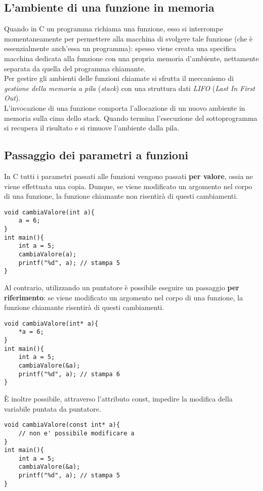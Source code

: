 \subsection{L'ambiente di una funzione in memoria}
Quando in C un programma richiama una funzione, esso si interrompe momentaneamente per permettere alla macchina di svolgere tale funzione (che è essenzialmente anch’essa un programma): spesso viene creata una specifica macchina dedicata alla funzione con una propria memoria d'ambiente, nettamente separata da quella del programma chiamante.\\
Per gestire gli ambienti delle funzioni chiamate si sfrutta il meccanismo di \textit{gestione della memoria a pila} (\textit{stack}) con una struttura dati \textit{LIFO} (\textit{Last In First Out}).\\ L’invocazione di una funzione comporta l’allocazione di un nuovo ambiente in memoria sulla cima dello stack. Quando termina l’esecuzione del sottoprogramma si recupera il risultato e si rimuove l'ambiente dalla pila.

\subsection{Passaggio dei parametri a funzioni}
In C tutti i parametri passati alle funzioni vengono passati \textbf{per valore}, ossia ne viene effettuata una copia. Dunque, se viene modificato un argomento nel corpo di una funzione, la funzione chiamante non risentirà di questi cambiamenti.
\begin{lstlisting}[title={Il passaggio per valore}]
void cambiaValore(int a){
    a = 6;
}
int main(){
    int a = 5;
    cambiaValore(a);
    printf("%d", a); // stampa 5
}
\end{lstlisting}
Al contrario, utilizzando un puntatore è possibile eseguire un passaggio \textbf{per riferimento}: se viene modificato un argomento nel corpo di una funzione, la funzione chiamante risentirà di questi cambiamenti.
\begin{lstlisting}[title={Il passaggio per riferimento}]
void cambiaValore(int* a){
    *a = 6;
}
int main(){
    int a = 5;
    cambiaValore(&a);
    printf("%d", a); // stampa 6
}
\end{lstlisting}

\`{E} inoltre possibile, attraverso l'attributo \colorbox{light-gray}{const}, impedire la modifica della variabile puntata da puntatore.
\begin{lstlisting}[title={Utilizzo dell'attributo const}]
void cambiaValore(const int* a){
    // non e' possibile modificare a
}
int main(){
    int a = 5;
    cambiaValore(&a);
    printf("%d", a); // stampa 5
}
\end{lstlisting}

